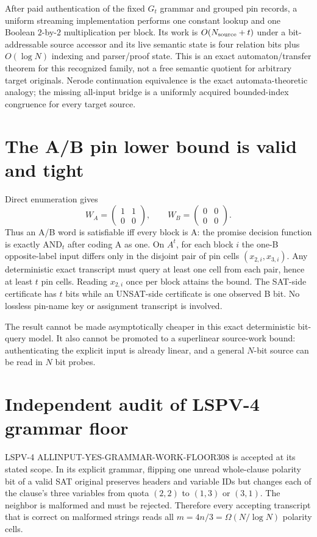 \documentclass[11pt]{article}
\begin{document}
After paid authentication of the fixed $G_t$ grammar and grouped pin records, a uniform streaming implementation performs one constant lookup and one Boolean $2$-by-$2$ multiplication per block.  Its work is $O(N_{\rm source}+t)$ under a bit-addressable source accessor and its live semantic state is four relation bits plus $O(\log N)$ indexing and parser/proof state.  This is an exact automaton/transfer theorem for this recognized family, not a free semantic quotient for arbitrary target originals.  Nerode continuation equivalence is the exact automata-theoretic analogy; the missing all-input bridge is a uniformly acquired bounded-index congruence for every target source.

\section{The A/B pin lower bound is valid and tight}
Direct enumeration gives
\[
 W_A=\begin{pmatrix}1&1\\0&0\end{pmatrix},\qquad
 W_B=\begin{pmatrix}0&0\\0&0\end{pmatrix}.
\]
Thus an A/B word is satisfiable iff every block is A: the promise decision function is exactly $\mathrm{AND}_t$ after coding A as one.  On $A^t$, for each block $i$ the one-B opposite-label input differs only in the disjoint pair of pin cells $(x_{2,i},x_{3,i})$.  Any deterministic exact transcript must query at least one cell from each pair, hence at least $t$ pin cells.  Reading $x_{2,i}$ once per block attains the bound.  The SAT-side certificate has $t$ bits while an UNSAT-side certificate is one observed B bit.  No lossless pin-name key or assignment transcript is involved.

The result cannot be made asymptotically cheaper in this exact deterministic bit-query model.  It also cannot be promoted to a superlinear source-work bound: authenticating the explicit input is already linear, and a general $N$-bit source can be read in $N$ bit probes.

\section{Independent audit of LSPV-4 grammar floor}
LSPV-4 ALLINPUT-YES-GRAMMAR-WORK-FLOOR308 is accepted at its stated scope.  In its explicit grammar, flipping one unread whole-clause polarity bit of a valid SAT original preserves headers and variable IDs but changes each of the clause's three variables from quota $(2,2)$ to $(1,3)$ or $(3,1)$.  The neighbor is malformed and must be rejected.  Therefore every accepting transcript that is correct on malformed strings reads all $m=4n/3=\Omega(N/\log N)$ polarity cells.
\end{document}
